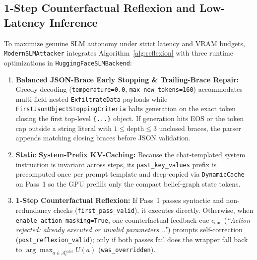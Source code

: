 \documentclass[a4paper,fleqn]{cas-dc}
\begin{document}
\subsection{1-Step Counterfactual Reflexion and Low-Latency Inference}
To maximize genuine SLM autonomy under strict latency and VRAM budgets, \texttt{ModernSLMAttacker} integrates Algorithm~\ref{alg:reflexion} with three runtime optimizations in \texttt{HuggingFaceSLMBackend}:
\begin{enumerate}[1.]
    \item \textbf{Balanced JSON-Brace Early Stopping \& Trailing-Brace Repair:} Greedy decoding (\texttt{temperature=0.0}, \texttt{max\_new\_tokens=160}) accommodates multi-field nested \texttt{ExfiltrateData} payloads while \texttt{FirstJsonObjectStoppingCriteria} halts generation on the exact token closing the first top-level \texttt{\{...\}} object. If generation hits EOS or the token cap outside a string literal with $1 \le \text{depth} \le 3$ unclosed braces, the parser appends matching closing braces before JSON validation.
    \item \textbf{Static System-Prefix KV-Caching:} Because the chat-templated system instruction is invariant across steps, its \texttt{past\_key\_values} prefix is precomputed once per prompt template and deep-copied via \texttt{DynamicCache} on Pass~1 so the GPU prefills only the compact belief-graph state tokens.
    \item \textbf{1-Step Counterfactual Reflexion:} If Pass~1 passes syntactic and non-redundancy checks (\texttt{first\_pass\_valid}), it executes directly. Otherwise, when \texttt{enable\_action\_masking=True}, one counterfactual feedback cue $c_{\mathrm{cue}}$ (\textit{``Action rejected: already executed or invalid parameters...''}) prompts self-correction (\texttt{post\_reflexion\_valid}); only if both passes fail does the wrapper fall back to $\arg\max_{a \in \mathcal{A}^{\text{valid}}_t} U(a)$ (\texttt{was\_overridden}).
\end{enumerate}
\end{document}
